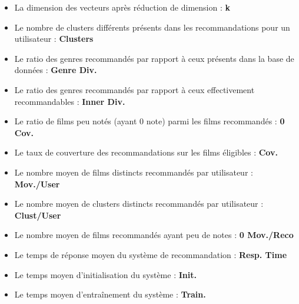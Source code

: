 \documentclass{article}
\begin{document}
\begin{itemize}
    \item La dimension des vecteurs après réduction de dimension : \textbf{k}
    \item Le nombre de clusters différents présents dans les recommandations pour un utilisateur : \textbf{Clusters}
    \item Le ratio des genres recommandés par rapport à ceux présents dans la base de données : \textbf{Genre Div.}
    \item Le ratio des genres recommandés par rapport à ceux effectivement recommandables : \textbf{Inner Div.}
    \item Le ratio de films peu notés (ayant 0 note) parmi les films recommandés : \textbf{0 Cov.}
    \item Le taux de couverture des recommandations sur les films éligibles : \textbf{Cov.}
    \item Le nombre moyen de films distincts recommandés par utilisateur : \textbf{Mov./User}
    \item Le nombre moyen de clusters distincts recommandés par utilisateur : \textbf{Clust/User}
    \item Le nombre moyen de films recommandés ayant peu de notes : \textbf{0 Mov./Reco}
    \item Le temps de réponse moyen du système de recommandation : \textbf{Resp. Time}
    \item Le temps moyen d’initialisation du système : \textbf{Init.}
    \item Le temps moyen d’entraînement du système : \textbf{Train.}
\end{itemize}
$ $\\
\end{document}
